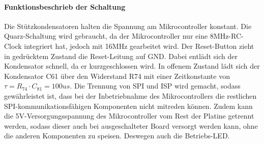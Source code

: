 \paragraph{Funktionsbeschrieb der Schaltung}\mbox{}

Die Stützkondensatoren halten die Spannung am Mikrocontroller konstant. Die Quarz-Schaltung wird gebraucht, da der Mikrocontroller nur eine 8MHz-RC-Clock integriert hat, jedoch mit 16MHz gearbeitet wird. Der Reset-Button zieht in gedrücktem Zustand die Reset-Leitung auf GND. Dabei entlädt sich der Kondensator schnell, da er kurzgeschlossen wird. In offenem Zustand lädt sich der Kondensator C61 über den Widerstand R74 mit einer Zeitkonstante von $\tau = R_{74} \cdot C_{81} = 100us$. Die Trennung von SPI und ISP wird gemacht, sodass gewährleistet ist, dass bei der Inbetriebnahme des Mikrocontrollers die restlichen SPI-kommunikationsfähigen Komponenten nicht mitreden können. Zudem kann die 5V-Versorgungsspannung des Mikrocontroller vom Rest der Platine getrennt werden, sodass dieser auch bei ausgeschalteter Board versorgt werden kann, ohne die anderen Komponenten zu speisen. Deswegen auch die Betriebs-LED.